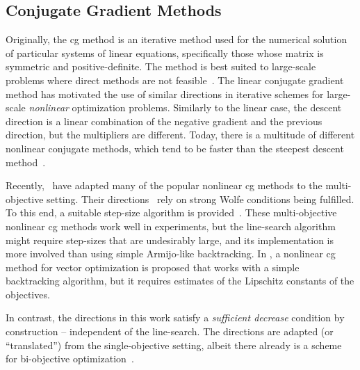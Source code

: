 \documentclass{article}
\theoremstyle{plain}
\theoremstyle{definition}
\begin{document}
\subsection*{Conjugate Gradient Methods}
Originally, the \ac{cg} method is an iterative method used for the 
numerical solution of particular systems of linear equations, 
specifically those whose matrix is symmetric and positive-definite. 
The method is best suited to large-scale problems where direct methods 
are not feasible~\cite{nocedalNumericalOptimization2006}.
The linear conjugate gradient method has motivated the use of similar 
directions in iterative schemes for large-scale \emph{nonlinear} optimization
problems. 
Similarly to the linear case, the descent direction is a linear combination 
of the negative gradient and the previous direction, but the 
multipliers are different.
Today, there is a multitude of different nonlinear conjugate methods, which 
tend to be faster than the steepest descent method~\cite{nocedalNumericalOptimization2006}.

Recently,~\citet{lucambioperezNonlinearConjugateGradient2018} have adapted 
many of the popular nonlinear \ac{cg} methods to the multi-objective setting.
Their directions~\cite{%
goncalvesExtensionHagerZhang2020,%
lucambioperezNonlinearConjugateGradient2018%
} rely on strong Wolfe conditions being fulfilled.
To this end, a suitable step-size algorithm is provided~\cite{lucambioperezWolfeLineSearch2019}.
These multi-objective nonlinear \ac{cg} methods work well in experiments, 
but the line-search algorithm might require step-sizes that are 
undesirably large,
and its implementation is more involved than using simple Armijo-like backtracking.
In \cite{goncalvesStudyLiuStoreyConjugate2022}, a nonlinear \ac{cg}
method for vector optimization is proposed that works with a simple 
backtracking algorithm, but it requires estimates of the Lipschitz constants
of the objectives.

In contrast, the directions in this work satisfy a \emph{sufficient decrease}
condition by construction -- independent of the line-search.
The directions are adapted (or “translated”) from the single-objective 
setting, albeit there already is a scheme for bi-objective optimization~\cite{elboulqeExplicitThreeTermPolak}.
\end{document}

